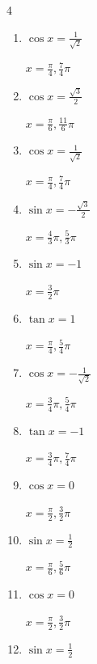 \begin{multicols}{4}
\begin{enumerate}
  \item $\displaystyle \cos{x}  = \frac{1}{\sqrt{2}}$

        $\displaystyle x = \frac{\pi}{4} , \frac{7}{4}\pi$

  \item $\displaystyle \cos{x}  = \frac{\sqrt{3}}{2}$

        $\displaystyle x = \frac{\pi}{6} , \frac{11}{6}\pi$

  \item $\displaystyle \cos{x}  = \frac{1}{\sqrt{2}}$

        $\displaystyle x = \frac{\pi}{4} , \frac{7}{4}\pi$

  \item $\displaystyle \sin{x}  = -\frac{\sqrt{3}}{2}$

        $\displaystyle x = \frac{4}{3}\pi , \frac{5}{3}\pi$

  \item $\displaystyle \sin{x}  = -1$

        $\displaystyle x = \frac{3}{2}\pi$

  \item $\displaystyle \tan{x}  = 1$

        $\displaystyle x = \frac{\pi}{4} , \frac{5}{4}\pi$

  \item $\displaystyle \cos{x}  = -\frac{1}{\sqrt{2}}$

        $\displaystyle x = \frac{3}{4}\pi , \frac{5}{4}\pi$

  \item $\displaystyle \tan{x}  = -1$

        $\displaystyle x = \frac{3}{4}\pi , \frac{7}{4}\pi$

  \item $\displaystyle \cos{x}  = 0$

        $\displaystyle x = \frac{\pi}{2} , \frac{3}{2}\pi$

  \item $\displaystyle \sin{x}  = \frac{1}{2}$

        $\displaystyle x = \frac{\pi}{6} , \frac{5}{6}\pi$

  \item $\displaystyle \cos{x}  = 0$

        $\displaystyle x = \frac{\pi}{2} , \frac{3}{2}\pi$

  \item $\displaystyle \sin{x}  = \frac{1}{2}$


\end{enumerate}
\end{multicols}
